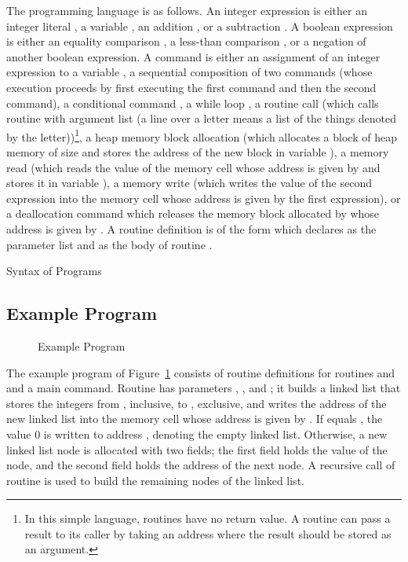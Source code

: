 \documentclass{CSML}
\theoremstyle{definition}\newtheorem{notation}[thm]{Notation}
\theoremstyle{plain}\newtheorem{satz}[thm]{Satz}
\begin{document}
The programming language is as follows. \label{cmd-syntax} An 
integer expression  is either an integer literal , a 
variable , an addition , or a subtraction . A 
boolean expression  is either an equality comparison , a less-than comparison , or a negation  of 
another boolean expression. A command  is either an 
assignment  of an integer expression  to a variable 
, a sequential composition  of two commands (whose 
execution proceeds by first executing the first command and 
then the second command), a conditional command , a while loop 
, a routine call 
 (which calls routine  with argument list 
 (a line over a letter means a list of the things 
denoted by the letter))\footnote{In this simple language, routines have no return value. A routine can pass a result to its caller by taking an address where the result should be stored as an argument.}, a heap memory block allocation  (which allocates a block of heap memory of size  and stores the 
address of the new block in variable ), a memory 
read  (which reads the value of the memory cell whose 
address is given by  and stores it in variable ), a 
memory write  (which writes the value of the second 
expression into the memory cell whose address is given by the 
first expression), or a deallocation command  
which releases the memory block allocated by  
whose address is given by . A routine definition 
 is of the form  which declares  as the 
parameter list and  as the body of routine . 

\begin{defi}{Syntax of Programs}\label{defi:cmd-syntax}



\end{defi}

\subsection{Example Program}

\begin{figure}

\caption{Example Program}\label{fig:example-program}
\end{figure}

The example program of Figure~\ref{fig:example-program} consists of routine definitions for 
routines  and  and a main 
command. Routine  has parameters , 
, and ; it builds a linked list 
that stores the integers from , inclusive, to 
, exclusive, and writes the address of the new 
linked list into the memory cell whose address is given by 
. If  equals , the 
value 0 is written to address , denoting the 
empty linked list. Otherwise, a new linked list node is 
allocated with two fields; the first field holds the value of 
the node, and the second field holds the address of the next 
node. A recursive call of routine  is used to 
build the remaining nodes of the linked list. 
\end{document}
